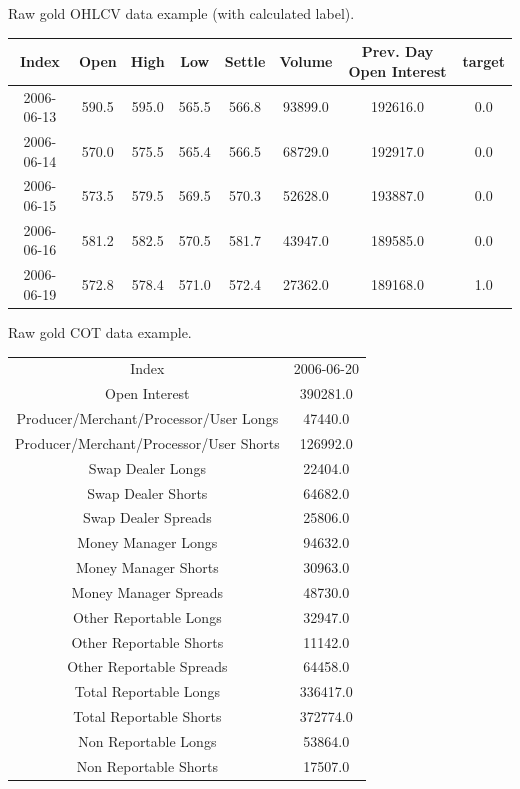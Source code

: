\documentclass[final,2p]{elsarticle}
\begin{document}
Raw gold OHLCV data example (with calculated label).
\nopagebreak[0]
\begin{center}
    \begin{tabular}{cccccccc}
    Index & Open &High &Low &Settle &Volume &Prev. Day Open Interest &target\\
    \hline
    2006-06-13 &590.5 &595.0 &565.5 &566.8 &93899.0 &192616.0 &0.0\\
    2006-06-14 &570.0 &575.5 &565.4 &566.5 &68729.0 &192917.0 &0.0\\
    2006-06-15 &573.5 &579.5 &569.5 &570.3 &52628.0 &193887.0 &0.0\\
    2006-06-16 &581.2 &582.5 &570.5 &581.7 &43947.0 &189585.0 &0.0\\
    2006-06-19 &572.8 &578.4 &571.0 &572.4 &27362.0 &189168.0 &1.0\\
    \end{tabular}
\end{center}

\clearpage
Raw gold COT data example.
\nopagebreak[0]
\begin{center}
    \begin{tabular}{c|c}
 	 Index & 2006-06-20\\
     Open Interest & 390281.0\\
     Producer/Merchant/Processor/User Longs & 47440.0 \\
     Producer/Merchant/Processor/User Shorts & 126992.0 \\
     Swap Dealer Longs & 22404.0 \\
     Swap Dealer Shorts & 64682.0 \\
     Swap Dealer Spreads & 25806.0 \\
     Money Manager Longs & 94632.0 \\
     Money Manager Shorts & 30963.0 \\
     Money Manager Spreads & 48730.0 \\
     Other Reportable Longs & 32947.0  \\
     Other Reportable Shorts & 11142.0 \\
     Other Reportable Spreads & 64458.0 \\
     Total Reportable Longs & 336417.0 \\
     Total Reportable Shorts & 372774.0 \\
     Non Reportable Longs & 53864.0 \\
     Non Reportable Shorts & 17507.0\\
    \end{tabular}
\end{center}
\end{document}
